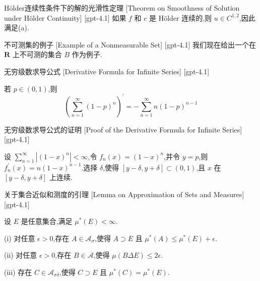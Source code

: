 \documentclass[UTF8]{ctexart}
\begin{document}
    
    
    \begin{thm}
        {Hölder连续性条件下的解的光滑性定理}
        [Theorem on Smoothness of Solution under Hölder Continuity]
        [gpt-4.1]
        如果 $f$ 和 $c$ 是 Hölder 连续的,则 $
u \in C^{1,2}$,因此满足(a).
    \end{thm}
    
    
    
    \begin{xmp}
        {不可测集的例子}
        [Example of a Nonmeasurable Set]
        [gpt-4.1]
        我们现在给出一个在 $\mathbf { R }$ 上不可测的集合 $B$ 作为例子.
    \end{xmp}
    
    
    
    \begin{thm}
        {无穷级数求导公式}
        [Derivative Formula for Infinite Series]
        [gpt-4.1]
        
若 $p \in (0, 1)$,则
\[
\left( \sum_{n=1}^{\infty} (1 - p)^{n} \right)^{\prime} = - \sum_{n=1}^{\infty} n (1 - p)^{n-1}
\]

    \end{thm}
    
    
    
    \begin{prf}
        {无穷级数求导公式的证明}
        [Proof of the Derivative Formula for Infinite Series]
        [gpt-4.1]
        
设 $\sum_{n=1}^{\infty} |(1 - x)^{n}| < \infty$,令 $f_{n}(x) = (1 - x)^{n}$,并令 $y = p$,则 $f_{n}^{\prime}(x) = n (1 - x)^{n-1}$.选择 $\delta$,使得 $[y - \delta, y + \delta] \subset (0, 1)$,且 $x$ 在 $[y - \delta, y + \delta]$ 上连续.

    \end{prf}
    
    
    
    \begin{lma}
        {关于集合近似和测度的引理}
        [Lemma on Approximation of Sets and Measures]
        [gpt-4.1]
        
设 $E$ 是任意集合,满足 $\mu ^ { * } ( E ) < \infty$.

(i) 对任意 $\epsilon > 0$,存在 $A \in \mathcal{A} _ { \sigma }$,使得 $A \supset E$ 且 $\mu ^ { * } ( A ) \leq \mu ^ { * } ( E ) + \epsilon$.

(ii) 对任意 $\epsilon > 0$,存在 $B \in \mathcal{A}$,使得 $\mu ( B \Delta E ) \leq 2 \epsilon$.

(iii) 存在 $C \in \mathcal{A} _ { \sigma \delta }$,使得 $C \supset E$ 且 $\mu ^ { * } ( C ) = \mu ^ { * } ( E )$.

    \end{lma}
    
\end{document}
